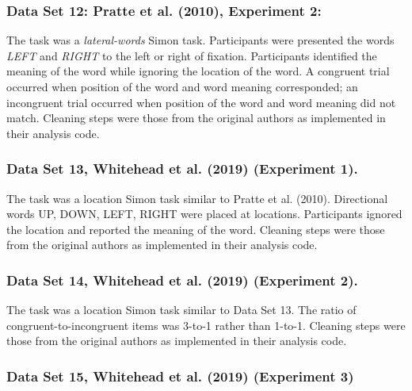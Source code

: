 \documentclass[
  ,man]{apa6}
\begin{document}
\hypertarget{data-set-12-pratte.etal.2010-experiment-2}{%
\subsubsection{Data Set 12: Pratte et al. (2010), Experiment 2:}\label{data-set-12-pratte.etal.2010-experiment-2}}

The task was a \emph{lateral-words} Simon task. Participants were presented the words \emph{LEFT} and \emph{RIGHT} to the left or right of fixation. Participants identified the meaning of the word while ignoring the location of the word. A congruent trial occurred when position of the word and word meaning corresponded; an incongruent trial occurred when position of the word and word meaning did not match. Cleaning steps were those from the original authors as implemented in their analysis code.

\hypertarget{data-set-13-whitehead.etal.2019-experiment-1.}{%
\subsubsection{Data Set 13, Whitehead et al. (2019) (Experiment 1).}\label{data-set-13-whitehead.etal.2019-experiment-1.}}

The task was a location Simon task similar to Pratte et al. (2010). Directional words UP, DOWN, LEFT, RIGHT were placed at locations. Participants ignored the location and reported the meaning of the word. Cleaning steps were those from the original authors as implemented in their analysis code.

\hypertarget{data-set-14-whitehead.etal.2019-experiment-2.}{%
\subsubsection{Data Set 14, Whitehead et al. (2019) (Experiment 2).}\label{data-set-14-whitehead.etal.2019-experiment-2.}}

The task was a location Simon task similar to Data Set 13. The ratio of congruent-to-incongruent items was 3-to-1 rather than 1-to-1. Cleaning steps were those from the original authors as implemented in their analysis code.

\hypertarget{data-set-15-whitehead.etal.2019-experiment-3}{%
\subsubsection{Data Set 15, Whitehead et al. (2019) (Experiment 3)}\label{data-set-15-whitehead.etal.2019-experiment-3}}
\end{document}
